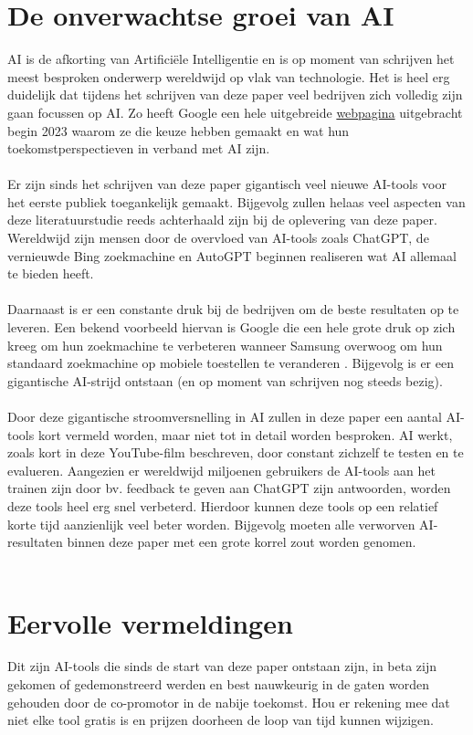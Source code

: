 \section{De onverwachtse groei van AI}
AI is de afkorting van Artificiële Intelligentie en is op moment van schrijven het meest besproken onderwerp wereldwijd op vlak van technologie. Het is heel erg duidelijk dat tijdens het schrijven van deze paper veel bedrijven zich volledig zijn gaan focussen op AI. Zo heeft Google een hele uitgebreide \href{https://ai.google/why-ai/}{webpagina} uitgebracht begin 2023 waarom ze die keuze hebben gemaakt en wat hun toekomstperspectieven in verband met AI zijn.
\\\\
Er zijn sinds het schrijven van deze paper gigantisch veel nieuwe AI-tools voor het eerste publiek toegankelijk gemaakt. Bijgevolg zullen helaas veel aspecten van deze literatuurstudie reeds achterhaald zijn bij de oplevering van deze paper. Wereldwijd zijn mensen door de overvloed van AI-tools zoals ChatGPT, de vernieuwde Bing zoekmachine en AutoGPT beginnen realiseren wat AI allemaal te bieden heeft.
\\\\
Daarnaast is er een constante druk bij de bedrijven om de beste resultaten op te leveren. Een bekend voorbeeld hiervan is Google die een hele grote druk op zich kreeg om hun zoekmachine te verbeteren wanneer Samsung overwoog om hun standaard zoekmachine op mobiele toestellen te veranderen \autocite{Paris2023}. Bijgevolg is er een gigantische AI-strijd ontstaan (en op moment van schrijven nog steeds bezig). 
\\\\
Door deze gigantische stroomversnelling in AI zullen in deze paper een aantal AI-tools kort vermeld worden, maar niet tot in detail worden besproken. AI werkt, zoals kort in deze YouTube-film \autocite{Grey2017} beschreven, door constant zichzelf te testen en te evalueren. Aangezien er wereldwijd miljoenen gebruikers de AI-tools aan het trainen zijn door bv. feedback te geven aan ChatGPT zijn antwoorden, worden deze tools heel erg snel verbeterd. Hierdoor kunnen deze tools op een relatief korte tijd aanzienlijk veel beter worden. Bijgevolg moeten alle verworven AI-resultaten binnen deze paper met een grote korrel zout worden genomen.
\\\\
\section{Eervolle vermeldingen}
Dit zijn AI-tools die sinds de start van deze paper ontstaan zijn, in beta zijn gekomen of gedemonstreerd werden en best nauwkeurig in de gaten worden gehouden door de co-promotor in de nabije toekomst. Hou er rekening mee dat niet elke tool gratis is en prijzen doorheen de loop van tijd kunnen wijzigen.
\\\\
